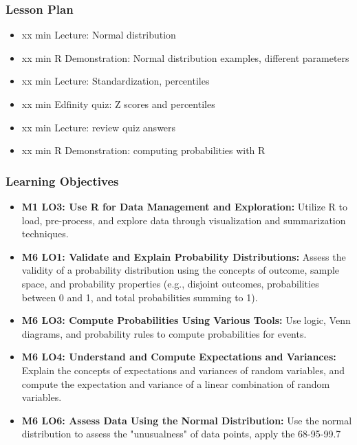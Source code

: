 \begin{frame}
    \frametitle{Lesson Plan}
    \begin{itemize}
        \item xx min Lecture: Normal distribution
        \item xx min R Demonstration: Normal distribution examples, different parameters
        \item xx min Lecture: Standardization, percentiles
        \item xx min Edfinity quiz: Z scores and percentiles
        \item xx min Lecture: review quiz answers
        \item xx min R Demonstration: computing probabilities with R
    \end{itemize}
\end{frame}

\begin{frame}
    \frametitle{Learning Objectives}
    \begin{itemize}
        \item \textbf{M1 LO3: Use R for Data Management and Exploration:} Utilize R to load, pre-process, and explore data through visualization and summarization techniques.
        \item \textbf{M6 LO1: Validate and Explain Probability Distributions:} Assess the validity of a probability distribution using the concepts of outcome, sample space, and probability properties (e.g., disjoint outcomes, probabilities between 0 and 1, and total probabilities summing to 1).
        \item \textbf{M6 LO3: Compute Probabilities Using Various Tools:} Use logic, Venn diagrams, and probability rules to compute probabilities for events.
        \item \textbf{M6 LO4: Understand and Compute Expectations and Variances:} Explain the concepts of expectations and variances of random variables, and compute the expectation and variance of a linear combination of random variables.
        \item \textbf{M6 LO6: Assess Data Using the Normal Distribution:} Use the normal distribution to assess the "unusualness" of data points, apply the 68-95-99.7%
    \end{itemize}
\end{frame}

